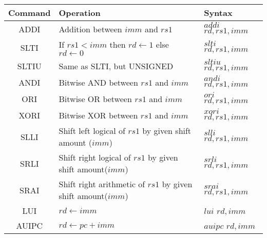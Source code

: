 	\begin{threeparttable}
		\begin{tabular}{|c|p{3in}|p{1in}|} \hline
		\setrow{\bfseries}Command &\setrow{\bfseries} Operation &\setrow{\bfseries} Syntax 	\\\hline
		\cellcolor{brightgreen}ADDI & {\small Addition between $imm$ and $rs1$} & {\small $addi$ $rd,rs1,imm$} 	\\\hline
		\cellcolor{brightgreen}SLTI & {\small If $rs1<imm$ then $rd\leftarrow1$ else $rd\leftarrow0$} & {\small $slti$ $rd,rs1,imm$} \\\hline
		\cellcolor{brightgreen}SLTIU& {\small Same as SLTI, but UNSIGNED} &{\small $sltiu$ $rd,rs1,imm$} 			\\\hline
		\cellcolor{brightgreen}ANDI & {\small Bitwise AND between $rs1$ and $imm$} & {\small $andi$ $rd,rs1,imm$}	\\\hline
		\cellcolor{brightgreen}ORI  & {\small Bitwise OR between $rs1$ and $imm$} & {\small $ori$ $rd,rs1,imm$}   \\\hline
		\cellcolor{brightgreen}XORI & {\small Bitwise XOR between $rs1$ and $imm$} & {\small $xori$ $rd,rs1,imm$} \\\hline
		\cellcolor{brightgreen}SLLI & {\small Shift left logical of $rs1$ by given shift amount ($imm$)} & {\small $slli$ $rd,rs1,imm$} \\\hline
		\cellcolor{brightgreen}SRLI & {\small Shift right logical of $rs1$ by given shift amount($imm$)} &
		{\small $srli$ $rd,rs1,imm$} \\\hline
		\cellcolor{brightgreen}SRAI & {\footnotesize Shift right arithmetic of $rs1$ by given shift amount($imm$)} &
		{\small $srai$ $rd,rs1,imm$} \\\hline
		\cellcolor{canaryyellow}LUI &{\small $rd\leftarrow imm$} & {\small $lui$ $rd,imm$} \\\hline
		\cellcolor{canaryyellow}AUIPC&{\small $rd\leftarrow pc+imm$} & {\small $auipc$ $rd, imm$} \\\hline
			
		\end{tabular}

		 \begin{tablenotes}
		 	

\end{tablenotes}
\end{threeparttable}
